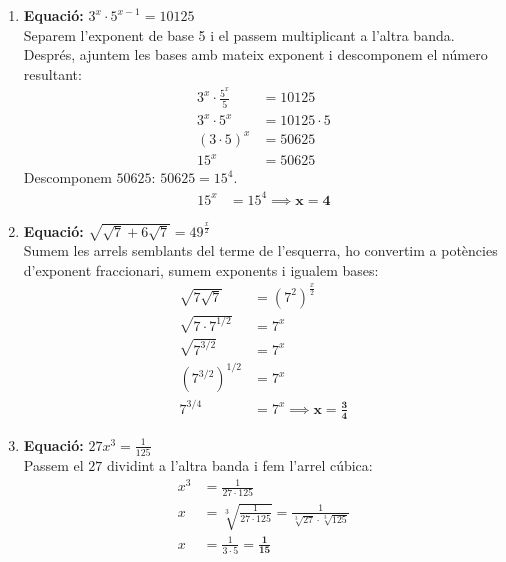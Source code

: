 \documentclass[12pt,a4paper]{article}
\begin{document}
\begin{enumerate}[label=\textbf{\alph*)}, leftmargin=*, itemsep=1cm]
    \item \textbf{Equació:} $3^x \cdot 5^{x-1} = 10125$ \\
    Separem l'exponent de base 5 i el passem multiplicant a l'altra banda. Després, ajuntem les bases amb mateix exponent i descomponem el número resultant:
    \begin{align*}
        3^x \cdot \frac{5^x}{5} &= 10125 \\
        3^x \cdot 5^x &= 10125 \cdot 5 \\
        (3 \cdot 5)^x &= 50625 \\
        15^x &= 50625
    \end{align*}
    Descomponem $50625$: $50625 = 15^4$.
    \begin{align*}
        15^x &= 15^4 \implies \mathbf{x = 4}
    \end{align*}

    \item \textbf{Equació:} $\sqrt{\sqrt{7} + 6\sqrt{7}} = 49^{\frac{x}{2}}$ \\
    Sumem les arrels semblants del terme de l'esquerra, ho convertim a potències d'exponent fraccionari, sumem exponents i igualem bases:
    \begin{align*}
        \sqrt{7\sqrt{7}} &= (7^2)^{\frac{x}{2}} \\
        \sqrt{7 \cdot 7^{1/2}} &= 7^x \\
        \sqrt{7^{3/2}} &= 7^x \\
        (7^{3/2})^{1/2} &= 7^x \\
        7^{3/4} &= 7^x \implies \mathbf{x = \frac{3}{4}}
    \end{align*}

    \item \textbf{Equació:} $27x^3 = \frac{1}{125}$ \\
    Passem el $27$ dividint a l'altra banda i fem l'arrel cúbica:
    \begin{align*}
        x^3 &= \frac{1}{27 \cdot 125} \\
        x &= \sqrt[3]{\frac{1}{27 \cdot 125}} = \frac{1}{\sqrt[3]{27} \cdot \sqrt[3]{125}} \\
        x &= \frac{1}{3 \cdot 5} = \mathbf{\frac{1}{15}}
    \end{align*}


\end{enumerate}
\end{document}
